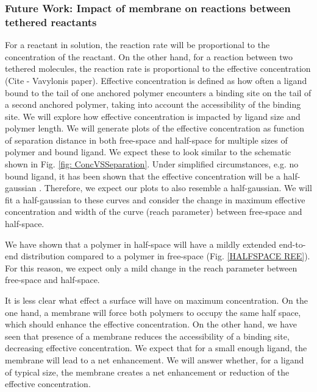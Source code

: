 \documentclass[../../AdvancementSummary.tex]{subfiles}
\begin{document}
       


\subsubsection{Future Work: Impact of membrane on reactions between tethered reactants}

For a reactant in solution, the reaction rate will be proportional to the concentration of the reactant. On the other hand, for a reaction between two tethered molecules, the reaction rate is proportional to the effective concentration \cite{VanValen2009,Bryant2017} (Cite - Vavylonis paper).
Effective concentration is defined as how often a ligand bound to the tail of one anchored polymer encounters a binding site on the tail of a second anchored polymer, taking into account the accessibility of the binding site. 
We will explore how effective concentration is impacted by ligand size and polymer length. We will generate plots of the effective concentration as function of separation distance in both free-space and half-space for multiple sizes of polymer and bound ligand. We expect these to look similar to the schematic shown in Fig. \ref{fig: ConcVSSeparation}. Under simplified circumstances, e.g. no bound ligand, it has been shown that the effective concentration will be a half-gaussian \cite{Goyette2017}. Therefore, we expect our plots to also resemble a half-gaussian. We will fit a half-gaussian to these curves and consider the change in maximum effective concentration and width of the curve (reach parameter) between free-space and half-space. 

We have shown that a polymer in half-space will have a mildly extended end-to-end distribution compared to a polymer in free-space (Fig. \ref{HALFSPACE REE}). For this reason, we expect only a mild change in the reach parameter between free-space and half-space. 

It is less clear what effect a surface will have on maximum concentration. 
	On the one hand, a membrane will force both polymers to occupy the same half space, which should enhance the effective concentration.
	On the other hand, we have seen that presence of a membrane reduces the accessibility of a binding site, decreasing effective concentration. 
	We expect that for a small enough ligand, the membrane will lead to a net enhancement. We will answer whether, for a ligand of typical size, the membrane creates a net enhancement or reduction of the effective concentration.
\end{document}
